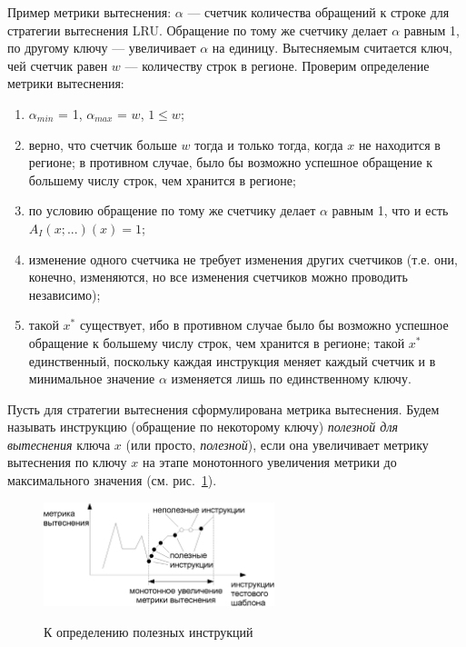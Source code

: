\documentclass[14pt]{extreport}
\newcommand{\LRU}{\textsf{LRU}\xspace}
\begin{document}
Пример метрики вытеснения: $\alpha$ --- счетчик количества обращений к строке для стратегии вытеснения \LRU. Обращение по тому же счетчику делает $\alpha$ равным 1, по другому ключу --- увеличивает $\alpha$ на единицу. Вытесняемым считается ключ, чей счетчик равен $w$ --- количеству строк в регионе. Проверим определение метрики вытеснения:
\begin{enumerate}
    \item $\alpha_{min}$ = 1, $\alpha_{max}$ = $w$, $1 \leqslant w$;
    \item верно, что счетчик больше $w$ тогда и только тогда, когда $x$ не находится в регионе; в противном случае, было бы возможно успешное обращение к большему числу строк, чем хранится в регионе;
    \item по условию обращение по тому же счетчику делает $\alpha$ равным 1, что и есть $A_I(x;...)(x) = 1$;
    \item изменение одного счетчика не требует изменения других счетчиков (т.е. они, конечно, изменяются, но все изменения счетчиков можно проводить независимо);
    \item такой $x^*$ существует, ибо в противном случае было бы возможно успешное обращение к большему числу строк, чем хранится в регионе; такой $x^*$ единственный, поскольку каждая инструкция меняет каждый счетчик и в минимальное значение $\alpha$ изменяется лишь по единственному ключу.
\end{enumerate}

Пусть для стратегии вытеснения сформулирована метрика вытеснения. Будем называть
инструкцию (обращение по некоторому ключу) \emph{полезной для вытеснения} ключа $x$ (или просто, \emph{полезной}), если она увеличивает метрику вытеснения по ключу $x$ на этапе монотонного увеличения метрики до максимального значения (см.
рис.~\ref{useful}).

\begin{figure}[h] \center
  \includegraphics[width=0.6\textwidth]{2.theor/useful}\\
  \caption{К определению полезных инструкций}\label{useful}
\end{figure}
\end{document}
